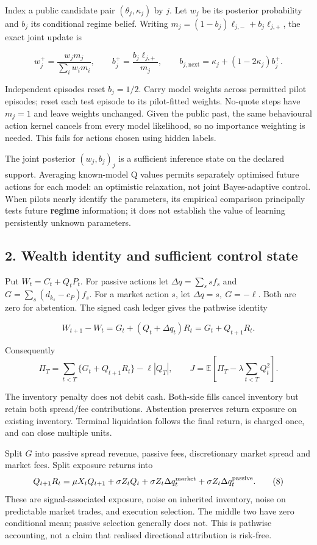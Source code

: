 \documentclass[
  10pt,
  a4paper,
]{article}
\begin{document}
Index a public candidate pair \((\theta_j,\kappa_j)\) by \(j\). Let
\(w_j\) be its posterior probability and \(b_j\) its conditional regime
belief. Writing \(m_j=(1-b_j)\ell_{j,-}+b_j\ell_{j,+}\), the exact joint
update is

\[
w_j^+=\frac{w_jm_j}{\sum_iw_im_i},\qquad
b_j^+=\frac{b_j\ell_{j,+}}{m_j},\qquad
b_{j,\mathrm{next}}=\kappa_j+(1-2\kappa_j)b_j^+.
\tag{5}
\]

Independent episodes reset \(b_j=1/2\). Carry model weights across
permitted pilot episodes; reset each test episode to its pilot-fitted
weights. No-quote steps have \(m_j=1\) and leave weights unchanged.
Given the public past, the same behavioural action kernel cancels from
every model likelihood, so no importance weighting is needed. This fails
for actions chosen using hidden labels.

The joint posterior \((w_j,b_j)_j\) is a sufficient inference state on
the declared support. Averaging known-model Q values permits separately
optimised future actions for each model: an optimistic relaxation, not
joint Bayes-adaptive control. When pilots nearly identify the
parameters, its empirical comparison principally tests future
\textbf{regime} information; it does not establish the value of learning
persistently unknown parameters.

\subsection{2. Wealth identity and sufficient control
state}\label{wealth-identity-and-sufficient-control-state}

Put \(W_t=C_t+Q_tP_t\). For passive actions let \(\Delta q=\sum_s sf_s\)
and \(G=\sum_s(d_{k_s}-c_P)f_s\). For a market action \(s\), let
\(\Delta q=s,\ G=-\ell\). Both are zero for abstention. The signed cash
ledger gives the pathwise identity

\[
W_{t+1}-W_t=G_t+(Q_t+\Delta q_t)R_t=G_t+Q_{t+1}R_t.
\tag{6}
\]

Consequently \[
\Pi_T=\sum_{t<T}\{G_t+Q_{t+1}R_t\}-\ell|Q_T|,
\qquad
J=\mathbb E\!\left[\Pi_T-\lambda\sum_{t<T}Q_t^2\right].
\tag{7}
\]

The inventory penalty does not debit cash. Both-side fills cancel
inventory but retain both spread/fee contributions. Abstention preserves
return exposure on existing inventory. Terminal liquidation follows the
final return, is charged once, and can close multiple units.

Split \(G\) into passive spread revenue, passive fees, discretionary
market spread and market fees. Split exposure returns into \[
Q_{t+1}R_t
=\mu X_tQ_{t+1}
+\sigma Z_tQ_t
+\sigma Z_t\Delta q_t^{\rm market}
+\sigma Z_t\Delta q_t^{\rm passive}.
\tag{8}
\] These are signal-associated exposure, noise on inherited inventory,
noise on predictable market trades, and execution selection. The middle
two have zero conditional mean; passive selection generally does not.
This is pathwise accounting, not a claim that realised directional
attribution is risk-free.
\end{document}
